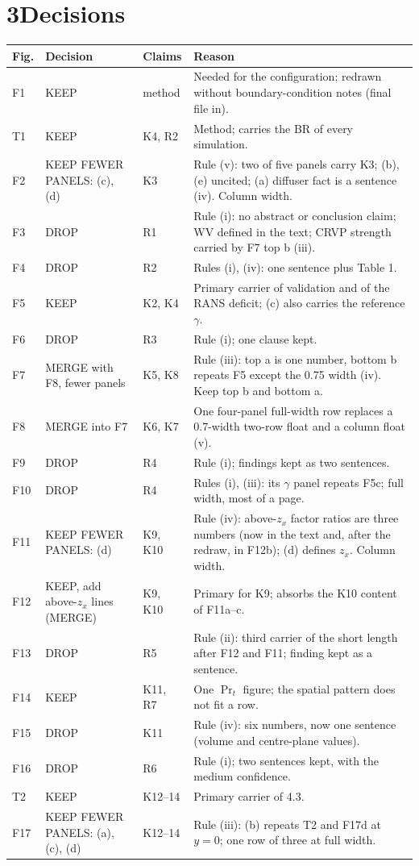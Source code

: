 \documentclass[10pt]{article}
\begin{document}
\section*{3\quad Decisions}
{\footnotesize
\begin{longtable}{@{}L{1.0cm} L{3.0cm} L{1.4cm} L{11.2cm}@{}}
\toprule
Fig. & Decision & Claims & Reason \\
\midrule
\endhead
F1 & KEEP & method & Needed for the configuration; redrawn without boundary-condition notes (final file in). \\
T1 & KEEP & K4, R2 & Method; carries the BR of every simulation. \\
F2 & KEEP FEWER PANELS: (c), (d) & K3 & Rule (v): two of five panels carry K3; (b), (e) uncited; (a) diffuser fact is a sentence (iv). Column width. \\
F3 & DROP & R1 & Rule (i): no abstract or conclusion claim; WV defined in the text; CRVP strength carried by F7 top b (iii). \\
F4 & DROP & R2 & Rules (i), (iv): one sentence plus Table 1. \\
F5 & KEEP & K2, K4 & Primary carrier of validation and of the RANS deficit; (c) also carries the reference $\gamma$. \\
F6 & DROP & R3 & Rule (i); one clause kept. \\
F7 & MERGE with F8, fewer panels & K5, K8 & Rule (iii): top a is one number, bottom b repeats F5 except the 0.75 width (iv). Keep top b and bottom a. \\
F8 & MERGE into F7 & K6, K7 & One four-panel full-width row replaces a 0.7-width two-row float and a column float (v). \\
F9 & DROP & R4 & Rule (i); findings kept as two sentences. \\
F10 & DROP & R4 & Rules (i), (iii): its $\gamma$ panel repeats F5c; full width, most of a page. \\
F11 & KEEP FEWER PANELS: (d) & K9, K10 & Rule (iv): above-$z_x$ factor ratios are three numbers (now in the text and, after the redraw, in F12b); (d) defines $z_x$. Column width. \\
F12 & KEEP, add above-$z_x$ lines (MERGE) & K9, K10 & Primary for K9; absorbs the K10 content of F11a--c. \\
F13 & DROP & R5 & Rule (ii): third carrier of the short length after F12 and F11; finding kept as a sentence. \\
F14 & KEEP & K11, R7 & One $\Pr_t$ figure; the spatial pattern does not fit a row. \\
F15 & DROP & K11 & Rule (iv): six numbers, now one sentence (volume and centre-plane values). \\
F16 & DROP & R6 & Rule (i); two sentences kept, with the medium confidence. \\
T2 & KEEP & K12--14 & Primary carrier of 4.3. \\
F17 & KEEP FEWER PANELS: (a), (c), (d) & K12--14 & Rule (iii): (b) repeats T2 and F17d at $y=0$; one row of three at full width. \\
\bottomrule
\end{longtable}}
\end{document}
